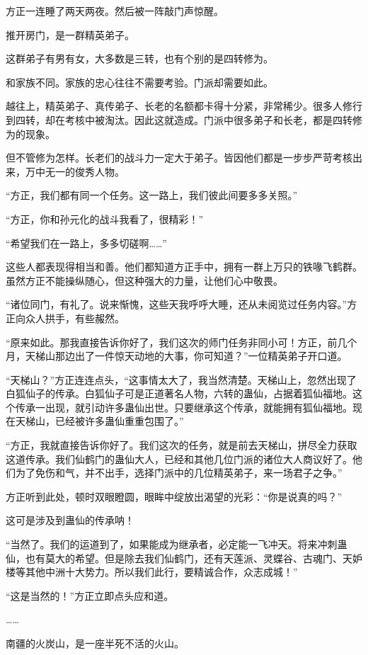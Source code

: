 \begin{this_body}
方正一连睡了两天两夜。然后被一阵敲门声惊醒。

推开房门，是一群精英弟子。

这群弟子有男有女，大多数是三转，也有个别的是四转修为。

和家族不同。家族的忠心往往不需要考验。门派却需要如此。

越往上，精英弟子、真传弟子、长老的名额都卡得十分紧，非常稀少。很多人修行到四转，却在考核中被淘汰。因此这就造成。门派中很多弟子和长老，都是四转修为的现象。

但不管修为怎样。长老们的战斗力一定大于弟子。皆因他们都是一步步严苛考核出来，万中无一的俊秀人物。

“方正，我们都有同一个任务。这一路上，我们彼此间要多多关照。”

“方正，你和孙元化的战斗我看了，很精彩！”

“希望我们在一路上，多多切磋啊……”

这些人都表现得相当和善。他们都知道方正手中，拥有一群上万只的铁喙飞鹤群。虽然方正不能操纵随心，但这种强大的力量，让他们心中敬畏。

“诸位同门，有礼了。说来惭愧，这些天我呼呼大睡，还从未阅览过任务内容。”方正向众人拱手，有些赧然。

“原来如此。那我直接告诉你好了，我们这次的师门任务非同小可！方正，前几个月，天梯山那边出了一件惊天动地的大事，你可知道？”一位精英弟子开口道。

“天梯山？”方正连连点头，“这事情太大了，我当然清楚。天梯山上，忽然出现了白狐仙子的传承。白狐仙子可是正道著名人物，六转的蛊仙，占据着狐仙福地。这个传承一出现，就引动许多蛊仙出世。只要继承这个传承，就能拥有狐仙福地。现在天梯山，已经被许多蛊仙重重包围了。”

“方正，我就直接告诉你好了。我们这次的任务，就是前去天梯山，拼尽全力获取这道传承。我们仙鹤门的蛊仙大人，已经和其他几位门派的诸位大人商议好了。他们为了免伤和气，并不出手，选择门派中的几位精英弟子，来一场君子之争。”

方正听到此处，顿时双眼瞪圆，眼眸中绽放出渴望的光彩：“你是说真的吗？”

这可是涉及到蛊仙的传承呐！

“当然了。我们的运道到了，如果能成为继承者，必定能一飞冲天。将来冲刺蛊仙，也有莫大的希望。但是除去我们仙鹤门，还有天莲派、灵蝶谷、古魂门、天妒楼等其他中洲十大势力。所以我们此行，要精诚合作，众志成城！”

“这是当然的！”方正立即点头应和道。

……

南疆的火炭山，是一座半死不活的火山。


\end{this_body}
